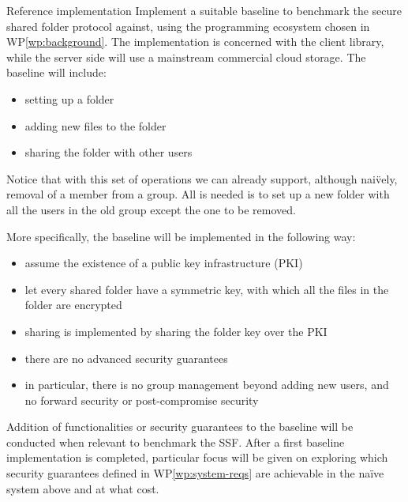 \documentclass[E]{BAMASA}
\begin{document}
\begin{workpackage}{Reference implementation}\label{wp:benchmark-baseline}
	Implement a suitable baseline to benchmark the secure shared folder protocol against, 
    using the programming ecosystem chosen in WP\ref{wp:background}.
    The implementation is concerned with the client library, while the server side will use a 
    mainstream commercial cloud storage.
    The baseline will include:
    \begin{itemize}
		\item setting up a folder
		\item adding new files to the folder
		\item sharing the folder with other users
	\end{itemize}
    Notice that with this set of operations we can already support, although nai\"vely, removal of 
    a member from a group. All is needed is to set up a new folder with all the users in the old group
    except the one to be removed.

    More specifically, the baseline will be implemented in the following way:
    \begin{itemize}
        \item assume the existence of a public key infrastructure (PKI)
        \item let every shared folder have a symmetric key, with which all the files in the folder are encrypted
        \item sharing is implemented by sharing the folder key over the PKI
        \item there are no advanced security guarantees
        \item in particular, there is no group management beyond adding new users, and no forward security or post-compromise security
    \end{itemize}

    Addition of functionalities or security guarantees to the baseline will be conducted when relevant to benchmark the SSF. 
    After a first baseline implementation is completed,
    particular focus will be given on exploring which security guarantees defined in WP\ref{wp:system-reqs} are achievable in the na\"ive system above and at what cost.

\end{workpackage}
\end{document}
